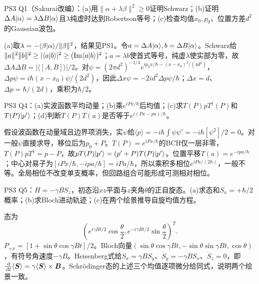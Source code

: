 \begin{exercise}
PS3 Q1（Sakurai改编）：(a)用$\|\alpha+\lambda\beta\|^2\ge0$证明Schwarz；(b)证明$\Delta A\lvert \alpha\rangle=\lambda\Delta B\lvert \alpha\rangle$且$\lambda$纯虚时达到Robertson等号；(c)检查均值$x_0,p_0$、位置方差$d^2$的Gaussian波包。
\end{exercise}
\begin{solution}
(a)取$\lambda=-\langle \beta\vert \alpha\rangle/\|\beta\|^2$，结果见PS1。令$a=\Delta A\lvert \alpha\rangle,b=\Delta B\lvert \alpha\rangle$。Schwarz给$\|a\|^2\|b\|^2\ge|\langle a\vert b\rangle|^2\ge(\operatorname{Im}\langle a\vert b\rangle)^2$；$a=\lambda b$使首式等号，纯虚$\lambda$使实部为零，故$\Delta A\Delta B=|\langle[A,B]\rangle|/2$。对$\psi=(2\pi d^2)^{-1/4}e^{ip_0x/\hbar-(x-x_0)^2/(4d^2)}$，$\Delta p\psi=i\hbar(x-x_0)\psi/(2d^2)$，因此$\Delta x\psi=-2id^2\Delta p\psi/\hbar$；$\Delta x=d$、$\Delta p=\hbar/(2d)$，乘积为$\hbar/2$。
\end{solution}
\begin{exercise}
PS3 Q4：(a)实波函数平均动量；(b)乘$e^{iPx/\hbar}$后均值；(c)求$T(P)pT^\dagger(P)$和$T(P)\lvert p'\rangle$；(d)判断$T(P)T(a)$是否等于$e^{i(Px-pa)/\hbar}$。
\end{exercise}
\begin{solution}
假设波函数在动量域且边界项消失，实$\psi$给$\langle p\rangle=-i\hbar\int\psi\psi'=-i\hbar[\psi^2]/2=0$。对一般$\psi$直接求导，移位后为$p_0+P$。$T(P)=e^{iPx/\hbar}$的BCH仅一层非零，$T(P)pT^\dagger=p-P$，故$pT(P)\lvert p'\rangle=(p'+P)T(P)\lvert p'\rangle$。位置平移$T(a)=e^{-ipa/\hbar}$；中心对易子为$[iPx/\hbar,-ipa/\hbar]=iPa/\hbar$，所以乘积多相位$e^{iPa/(2\hbar)}$，一般不等。全局相位不改变单支概率，但回路组合可能形成可测相对相位。
\end{solution}
\begin{exercise}
PS3 Q5：$H=-\gamma BS_z$，初态沿$xz$平面与$z$夹角$\theta$的正自旋态。(a)求态和$S_x=+\hbar/2$概率；(b)求Bloch进动轨迹；(c)在两个绘景推导自旋均值方程。
\end{exercise}
\begin{solution}
态为
\[(e^{i\gamma Bt/2}\cos\frac\theta2,e^{-i\gamma Bt/2}\sin\frac\theta2)^T.\]
$P_{+x}=[1+\sin\theta\cos\gamma Bt]/2$。Bloch向量$(\sin\theta\cos\gamma Bt,-\sin\theta\sin\gamma Bt,\cos\theta)$，有符号角速度$-\gamma B$。Heisenberg式给$\dot S_x=\gamma BS_y$、$\dot S_y=-\gamma BS_x$、$\dot S_z=0$，即$\frac{\,\mathrm d}{\,\mathrm d t}\langle\boldsymbol{S}\rangle=\gamma\langle\boldsymbol{S}\rangle\times\boldsymbol{B}$。Schrödinger态的上述三个均值逐项微分给同式，说明两个绘景一致。
\end{solution}

